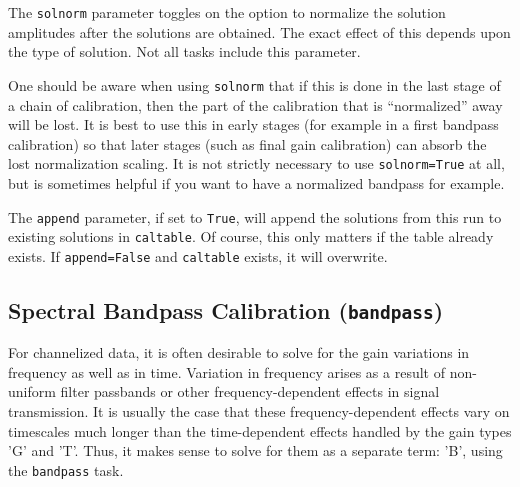 The {\tt solnorm} parameter toggles on the option to normalize the
solution amplitudes after the solutions are obtained.  The exact
effect of this depends upon the type of solution.  Not all tasks
include this parameter.  

One should be aware when using {\tt solnorm} that if this is done
in the last stage of a chain of calibration, then the part of 
the calibration that is ``normalized'' away will be lost.  It is
best to use this in early stages (for example in a first bandpass
calibration) so that later stages (such as final gain calibration)
can absorb the lost normalization scaling.  It is not strictly
necessary to use {\tt solnorm=True} at all, but is sometimes helpful
if you want to have a normalized bandpass for example.

The {\tt append} parameter, if set to {\tt True}, will append the
solutions from this run to existing solutions in {\tt caltable}.
Of course, this only matters if the table already exists.  If
{\tt append=False} and {\tt caltable} exists, it will overwrite.

\subsection{Spectral Bandpass Calibration ({\tt bandpass})}
\label{section:cal.solve.band}

For channelized data, it is often desirable to solve for the gain
variations in frequency as well as in time.  Variation in frequency
arises as a result of non-uniform filter passbands or other frequency-dependent
effects in signal transmission.  It is usually the case that these
frequency-dependent effects vary on timescales much longer than the
time-dependent effects handled by the gain types 'G' and 'T'.  
Thus, it makes sense to solve for them as a separate term: 'B', using the
{\tt bandpass} task.

